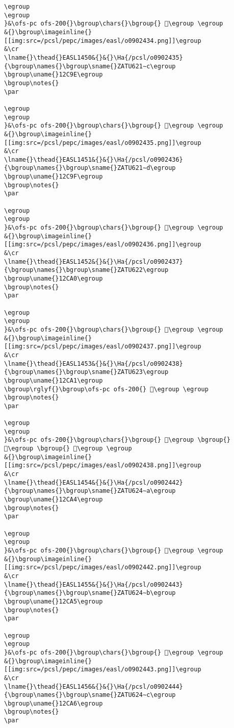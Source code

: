 \begin{verbatim}
\egroup
\egroup
}&\ofs-pc ofs-200{}\bgroup\chars{}\bgroup{} 𒲝\egroup \egroup
&{}\bgroup\imageinline{}[[img:src=/pcsl/pepc/images/easl/o0902434.png]]\egroup
&\cr
\lname{}\thead{}EASL1450&{}&{}\Ha{/pcsl/o0902435}{\bgroup\names{}\bgroup\sname{}ZATU621∼c\egroup
\bgroup\uname{}12C9E\egroup
\bgroup\notes{}
\par 

\egroup
\egroup
}&\ofs-pc ofs-200{}\bgroup\chars{}\bgroup{} 𒲞\egroup \egroup
&{}\bgroup\imageinline{}[[img:src=/pcsl/pepc/images/easl/o0902435.png]]\egroup
&\cr
\lname{}\thead{}EASL1451&{}&{}\Ha{/pcsl/o0902436}{\bgroup\names{}\bgroup\sname{}ZATU621∼d\egroup
\bgroup\uname{}12C9F\egroup
\bgroup\notes{}
\par 

\egroup
\egroup
}&\ofs-pc ofs-200{}\bgroup\chars{}\bgroup{} 𒲟\egroup \egroup
&{}\bgroup\imageinline{}[[img:src=/pcsl/pepc/images/easl/o0902436.png]]\egroup
&\cr
\lname{}\thead{}EASL1452&{}&{}\Ha{/pcsl/o0902437}{\bgroup\names{}\bgroup\sname{}ZATU622\egroup
\bgroup\uname{}12CA0\egroup
\bgroup\notes{}
\par 

\egroup
\egroup
}&\ofs-pc ofs-200{}\bgroup\chars{}\bgroup{} 𒲠\egroup \egroup
&{}\bgroup\imageinline{}[[img:src=/pcsl/pepc/images/easl/o0902437.png]]\egroup
&\cr
\lname{}\thead{}EASL1453&{}&{}\Ha{/pcsl/o0902438}{\bgroup\names{}\bgroup\sname{}ZATU623\egroup
\bgroup\uname{}12CA1\egroup
\bgroup\rglyf{}\bgroup\ofs-pc ofs-200{} 𒲡\egroup \egroup
\bgroup\notes{}
\par 

\egroup
\egroup
}&\ofs-pc ofs-200{}\bgroup\chars{}\bgroup{} 𒲣\egroup \bgroup{} 𒲢\egroup \bgroup{} 𒲡\egroup \egroup
&{}\bgroup\imageinline{}[[img:src=/pcsl/pepc/images/easl/o0902438.png]]\egroup
&\cr
\lname{}\thead{}EASL1454&{}&{}\Ha{/pcsl/o0902442}{\bgroup\names{}\bgroup\sname{}ZATU624∼a\egroup
\bgroup\uname{}12CA4\egroup
\bgroup\notes{}
\par 

\egroup
\egroup
}&\ofs-pc ofs-200{}\bgroup\chars{}\bgroup{} 𒲤\egroup \egroup
&{}\bgroup\imageinline{}[[img:src=/pcsl/pepc/images/easl/o0902442.png]]\egroup
&\cr
\lname{}\thead{}EASL1455&{}&{}\Ha{/pcsl/o0902443}{\bgroup\names{}\bgroup\sname{}ZATU624∼b\egroup
\bgroup\uname{}12CA5\egroup
\bgroup\notes{}
\par 

\egroup
\egroup
}&\ofs-pc ofs-200{}\bgroup\chars{}\bgroup{} 𒲥\egroup \egroup
&{}\bgroup\imageinline{}[[img:src=/pcsl/pepc/images/easl/o0902443.png]]\egroup
&\cr
\lname{}\thead{}EASL1456&{}&{}\Ha{/pcsl/o0902444}{\bgroup\names{}\bgroup\sname{}ZATU624∼c\egroup
\bgroup\uname{}12CA6\egroup
\bgroup\notes{}
\par 


\end{verbatim}
